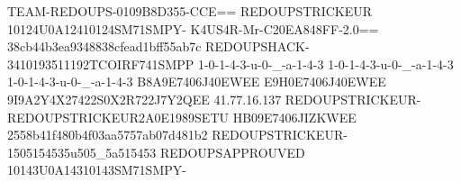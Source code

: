 TEAM-REDOUPS-0109B8D355-CCE==
REDOUPSTRICKEUR 10124U0A12410124SM71SMPY-
K4US4R-Mr-C20EA848FF-2.0==
38cb44b3ea9348838cfead1bff55ab7c
REDOUPSHACK-3410193511192TCOIRF741SMPP
1-0-1-4-3-u-0-_-a-1-4-3
1-0-1-4-3-u-0-_-a-1-4-3
1-0-1-4-3-u-0-_-a-1-4-3
B8A9E7406J40EWEE
E9H0E7406J40EWEE
9I9A2Y4X27422S0X2R722J7Y2QEE
41.77.16.137
REDOUPSTRICKEUR-REDOUPSTRICKEUR2A0E1989SETU
HB09E7406JIZKWEE
2558b41f480b4f03aa5757ab07d481b2
REDOUPSTRICKEUR-1505154535u505_5a515453
REDOUPSAPPROUVED 10143U0A14310143SM71SMPY-
